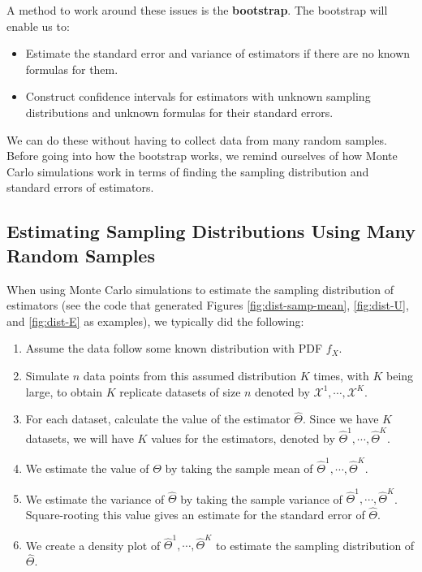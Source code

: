 \documentclass[
]{book}
\theoremstyle{definition}
\theoremstyle{definition}
\theoremstyle{definition}
\theoremstyle{definition}
\theoremstyle{remark}
\begin{document}
A method to work around these issues is the \textbf{bootstrap}. The bootstrap will enable us to:

\begin{itemize}
\item
  Estimate the standard error and variance of estimators if there are no known formulas for them.
\item
  Construct confidence intervals for estimators with unknown sampling distributions and unknown formulas for their standard errors.
\end{itemize}

We can do these without having to collect data from many random samples. Before going into how the bootstrap works, we remind ourselves of how Monte Carlo simulations work in terms of finding the sampling distribution and standard errors of estimators.

\hypertarget{estimating-sampling-distributions-using-many-random-samples}{%
\subsection{Estimating Sampling Distributions Using Many Random Samples}\label{estimating-sampling-distributions-using-many-random-samples}}

When using Monte Carlo simulations to estimate the sampling distribution of estimators (see the code that generated Figures \ref{fig:dist-samp-mean}, \ref{fig:dist-U}, and \ref{fig:dist-E} as examples), we typically did the following:

\begin{enumerate}
\def\labelenumi{\arabic{enumi}.}
\item
  Assume the data follow some known distribution with PDF \(f_X\).
\item
  Simulate \(n\) data points from this assumed distribution \(K\) times, with \(K\) being large, to obtain \(K\) replicate datasets of size \(n\) denoted by \(\mathcal{X}^{1}, \cdots, \mathcal{X}^{K}\).
\item
  For each dataset, calculate the value of the estimator \(\hat{\Theta}\). Since we have \(K\) datasets, we will have \(K\) values for the estimators, denoted by \(\hat{\Theta}^{1}, \cdots, \hat{\Theta}^{K}\).
\item
  We estimate the value of \(\Theta\) by taking the sample mean of \(\hat{\Theta}^{1}, \cdots, \hat{\Theta}^{K}\).
\item
  We estimate the variance of \(\hat{\Theta}\) by taking the sample variance of \(\hat{\Theta}^{1}, \cdots, \hat{\Theta}^{K}\). Square-rooting this value gives an estimate for the standard error of \(\hat{\Theta}\).
\item
  We create a density plot of \(\hat{\Theta}^{1}, \cdots, \hat{\Theta}^{K}\) to estimate the sampling distribution of \(\hat{\Theta}\).
\end{enumerate}
\end{document}
